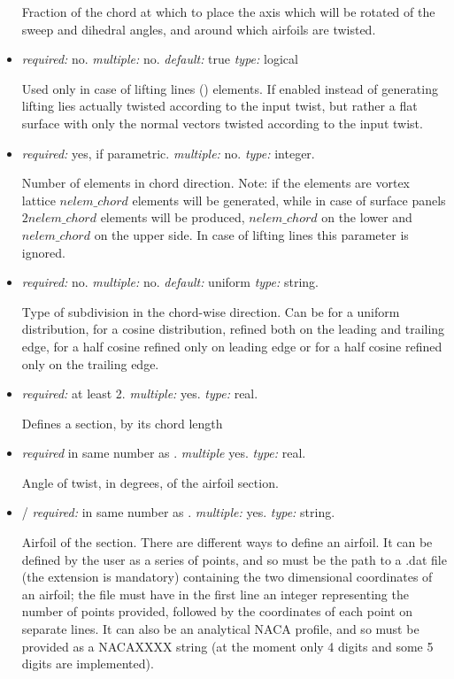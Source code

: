 \begin{itemize}
Fraction of the chord at which to place the axis which will be rotated of the sweep and dihedral angles, and 
around which airfoils are twisted. 

\item {} \textit{required:} no. \textit{multiple:} no. 
\textit{default:} true \textit{type:} logical

Used only in case of lifting lines () elements. If enabled instead of generating lifting lies 
actually twisted according to the input twist, but rather a flat surface with only the normal vectors twisted 
according to the input twist. 

\item {} \textit{required:} yes, if parametric. \textit{multiple:} no. \textit{type:} integer.

Number of elements in chord direction. Note: if the elements are vortex lattice $nelem\_chord$ 
elements will be generated, while in case of surface panels $2nelem\_chord$ elements will be produced, 
$nelem\_chord$ on the lower and $nelem\_chord$ on the upper side. In case of lifting lines this parameter is ignored.

\item {} \textit{required:} no. \textit{multiple:} no. 
\textit{default:} uniform \textit{type:} string.

Type of subdivision in the chord-wise direction. Can be  for a uniform distribution, 
 for a cosine distribution, refined both on the leading and trailing edge, 
 for a half cosine refined only on leading edge or  for a half cosine refined only on the trailing edge. 

\item {} \textit{required:} at least 2. \textit{multiple:} yes. \textit{type:} real.

Defines a section, by its chord length

\item {} \textit{required} in same number as . \textit{multiple} yes. \textit{type:} real.

Angle of twist, in degrees, of the airfoil section.

\item {}/ \textit{required:} in same number as 
. \textit{multiple:} yes. \textit{type:} string.

Airfoil of the section. There are different ways to define an airfoil. It can be defined by the user as a 
series of points, and so  must be the path to a .dat file (the extension is mandatory) 
containing the two dimensional coordinates of an airfoil; the file must have in the first line an integer 
representing the number of points provided, followed by the coordinates of each point on separate lines. 
It can also be an analytical NACA profile, and so must be provided as a 
NACAXXXX string (at the moment only 4 digits and some 5 digits are implemented). 


\end{itemize}
